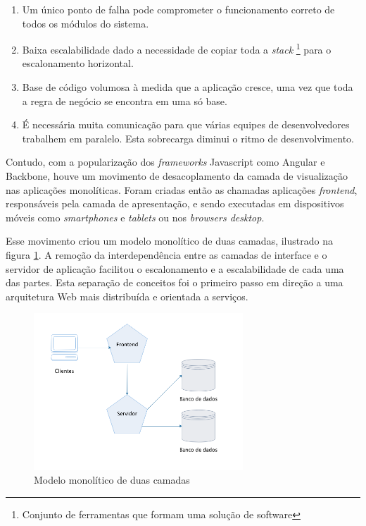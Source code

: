 \begin{enumerate}[label=\alph*)]
    \item Um único ponto de falha pode comprometer o funcionamento correto de todos os módulos do sistema.
    \item Baixa escalabilidade dado a necessidade de copiar toda a \textit{stack} \footnote{Conjunto de ferramentas que formam uma solução de software} para o escalonamento horizontal.
    \item Base de código volumosa à medida que a aplicação cresce, uma vez que toda a regra de negócio se encontra em uma só base.
    \item É necessária muita comunicação para que várias equipes de desenvolvedores trabalhem em paralelo. Esta sobrecarga diminui o ritmo de desenvolvimento.
\end{enumerate}

Contudo, com a popularização dos \textit{frameworks} Javascript como Angular e Backbone, houve um movimento de desacoplamento da camada de visualização nas aplicações monolíticas. Foram criadas então as chamadas aplicações \textit{frontend}, responsáveis pela camada de apresentação, e sendo executadas em dispositivos móveis como \textit{smartphones} e \textit{tablets} ou nos \textit{browsers desktop}. 

Esse movimento criou um modelo monolítico de duas camadas, ilustrado na figura \ref{fig:two-tier-monolithic}. A remoção da interdependência entre as camadas de interface e o servidor de aplicação facilitou o escalonamento e a escalabilidade de cada uma das partes. Esta separação de conceitos foi o primeiro passo em direção a uma arquitetura Web mais distribuída e orientada a serviços.

\begin{figure}[htbp]
    \centering
    \includegraphics[width=0.7\textwidth]{figuras/monolithic-2-tier.png}
    \caption{Modelo monolítico de duas camadas}
    \label{fig:two-tier-monolithic}
\end{figure}

